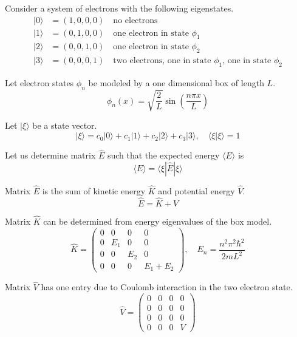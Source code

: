 \documentclass[12pt]{article}
\begin{document}
Consider a system of electrons with the following eigenstates.
\begin{align*}
|0\rangle&=(1,0,0,0)\quad\text{no electrons}\\
|1\rangle&=(0,1,0,0)\quad\text{one electron in state $\phi_1$}\\
|2\rangle&=(0,0,1,0)\quad\text{one electron in state $\phi_2$}\\
|3\rangle&=(0,0,0,1)\quad\text{two electrons, one in state $\phi_1$, one in state $\phi_2$}
\end{align*}

Let electron states $\phi_n$ be modeled by a one dimensional box of length $L$.
\begin{equation*}
\phi_n(x)=\sqrt{\frac{2}{L}}\sin\left(\frac{n\pi x}{L}\right)
\end{equation*}

Let $|\xi\rangle$ be a state vector.
\begin{equation*}
|\xi\rangle=c_0|0\rangle+c_1|1\rangle+c_2|2\rangle+c_3|3\rangle,\quad\langle\xi|\xi\rangle=1
\end{equation*}

Let us determine matrix $\hat{E}$ such that the expected
energy $\langle E \rangle$ is
\begin{equation*}
\langle E\rangle=\langle\xi|\hat{E}|\xi\rangle
\end{equation*}

Matrix $\hat{E}$ is the sum of kinetic energy $\hat K$ and potential energy $\hat V$.
\begin{equation*}
\hat{E}=\hat{K}+\hat{V}
\end{equation*}

Matrix $\hat{K}$ can be determined from energy eigenvalues of the box model.
\begin{equation*}
\hat{K}=\begin{pmatrix}
0 & 0 & 0 & 0\\
0 & E_1 & 0 & 0\\
0 & 0 & E_2 & 0\\
0 & 0 & 0 & E_1+E_2
\end{pmatrix},
\quad
E_n=\frac{n^2\pi^2\hbar^2}{2mL^2}
\end{equation*}

Matrix $\hat{V}$ has one entry due to Coulomb interaction in the two electron state.
\begin{equation*}
\hat{V}=
\begin{pmatrix}
0 & 0 & 0 & 0\\
0 & 0 & 0 & 0\\
0 & 0 & 0 & 0\\
0 & 0 & 0 & V
\end{pmatrix}
\end{equation*}
\end{document}
